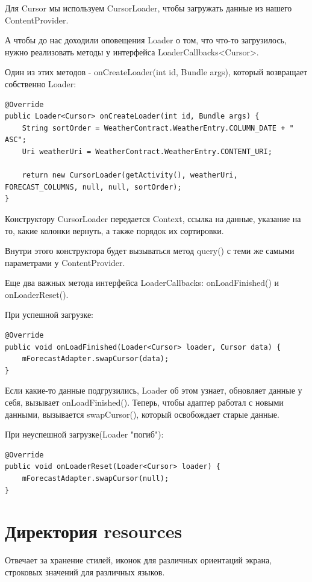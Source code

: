 \documentclass[12 pt]{article}
\begin{document}
    Для Cursor мы используем CursorLoader, чтобы загружать данные из нашего ContentProvider.
    
    А чтобы до нас доходили оповещения Loader о том, что что-то загрузилось, нужно реализовать методы у интерфейса LoaderCallbacks<Cursor>.
    
    Один из этих методов - onCreateLoader(int id, Bundle args), который возвращает собственно Loader:
    
    \begin{lstlisting}
@Override
public Loader<Cursor> onCreateLoader(int id, Bundle args) {
	String sortOrder = WeatherContract.WeatherEntry.COLUMN_DATE + " ASC";
	Uri weatherUri = WeatherContract.WeatherEntry.CONTENT_URI;

	return new CursorLoader(getActivity(), weatherUri, FORECAST_COLUMNS, null, null, sortOrder);
}
    \end{lstlisting}

Конструктору CursorLoader передается Context, ссылка на данные, указание на то, какие колонки вернуть, а также порядок их сортировки.

Внутри этого конструктора будет вызываться метод query() с теми же самыми параметрами у ContentProvider.

Еще два важных метода интерфейса LoaderCallbacks: onLoadFinished() и onLoaderReset().

При успешной загрузке:

	\begin{lstlisting}
@Override
public void onLoadFinished(Loader<Cursor> loader, Cursor data) {
	mForecastAdapter.swapCursor(data);
}
    \end{lstlisting}
Если какие-то данные подгрузились, Loader об этом узнает, обновляет данные у себя, вызывает onLoadFinished(). Теперь, чтобы адаптер работал с новыми данными, вызывается swapCursor(), который освобождает старые данные.    

При неуспешной загрузке(Loader "погиб"):

	\begin{lstlisting}
@Override
public void onLoaderReset(Loader<Cursor> loader) {
	mForecastAdapter.swapCursor(null);
}
    \end{lstlisting}

\section{Директория resources}
Отвечает за хранение стилей, иконок для различных ориентаций экрана, строковых значений для различных языков.
\end{document}
